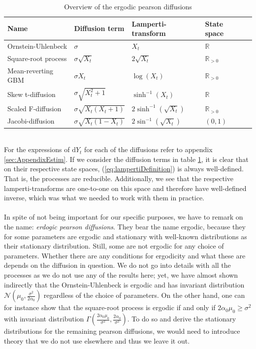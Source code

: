 \begin{table}[h!]
    \begin{center}
    \begin{tabular}{lllll}\hline
    \textbf{Name} & \textbf{Diffusion term} & \textbf{Lamperti-transform} & \textbf{State space}\\ \hline
    Ornstein-Uhlenbeck  & $\sigma$  & $X_t$ & $\mathbb{R}$ \\
    Square-root process & $\sigma\sqrt{X_t}$  & $ 2\sqrt{X_t}$ & $\mathbb{R}_{>0}$ \\
    Mean-reverting GBM  & $\sigma X_t $  & $ \log\left(X_t\right)$  & $\mathbb{R}_{>0}$ \\
    Skew t-diffusion  & $\sigma\sqrt{X_t^2 + 1}$  & $ \sinh^{-1}(X_t)$ & $\mathbb{R}$\\
    Scaled F-diffusion  & $\sigma\sqrt{X_t\left(X_t + 1\right)}$  & $ 2\sinh^{-1}\left(\sqrt{X_t}\right)$ & $\mathbb{R}_{>0}$ \\
    Jacobi-diffusion  & $\sigma\sqrt{X_t\left(1 - X_t\right)}$  & $ 2\sin^{-1}\left(\sqrt{X_t}\right)$ & $(0, 1)$ \\ \hline
    \end{tabular}
    \caption{Overview of the ergodic pearson diffusions}
    \label{table:ergodicDiffusions}
\end{center}
\end{table}\\
For the expressions of $\mathrm{d}Y_t$ for each of the diffusions refer to appendix \ref{sec:AppendixEstim}. If we consider the diffusion terms in table \ref{table:ergodicDiffusions}, it is clear that on their respective state spaces, (\ref{eq:lampertiDefinition}) is always well-defined. That is, the processes are reducible. Additionally, we see that the respective lamperti-transforms are one-to-one on this space and therefore have well-defined inverse, which was what we needed to work with them in practice. \\\\
In spite of not being important for our specific purposes, we have to remark on the name: \textit{erdogic pearson diffusions}. They bear the name ergodic, because they for some parameters are ergodic and stationary with well-known distributions as their stationary distribution. Still, some are not ergodic for any choice of parameters. Whether there are any conditions for ergodicity and what these are depends on the diffusion in question. We do not go into details with all the processes as we do not use any of the results here; yet, we have almost shown indirectly that the Ornstein-Uhlenbeck is ergodic and has invariant distribution $\mathcal{N}\left(\mu_0, \frac{\sigma^2}{2\alpha_0}\right)$ regardless of the choice of parameters. On the other hand, one can for instance show that the square-root process is ergodic if and only if $2\alpha_0\mu_0\geq \sigma^2$ with invariant distribution $\Gamma\left(\frac{2\alpha_0\mu_0}{\sigma^2}, \frac{2\alpha_0}{\sigma^2}\right)$. To do so and derive the stationary distributions for the remaining pearson diffusions, we would need to introduce theory that we do not use elsewhere and thus we leave it out. 

